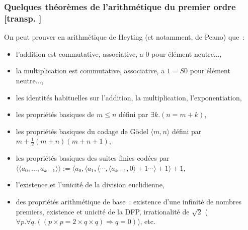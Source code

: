 \documentclass[mathserif,a4paper,aspectratio=169]{beamer}
\newcommand{\dbllangle}{\mathopen{\langle\!\langle}}
\newcommand{\dblrangle}{\mathclose{\rangle\!\rangle}}
\renewcommand{\frametitle}[1]{\subsubsection*{#1 {\footnotesize[transp. \insertframenumber]}}}
\begin{document}
\begin{frame}
\frametitle{Quelques théorèmes de l'arithmétique du premier ordre}

On peut prouver en arithmétique de Heyting (et notamment, de Peano)
que :
\begin{itemize}
\item l'addition est commutative, associative, a $0$ pour élément
  neutre...,
\item la multiplication est commutative, associative, a $1 = S0$ pour
  élément neutre...,
\item les identités habituelles sur l'addition, la multiplication,
  l'exponentiation,
\item les propriétés basiques de $m\leq n$ défini par $\exists
  k.(n=m+k)$,
\item les propriétés basiques du codage de Gödel $\langle m,n\rangle$
  défini par $m + \frac{1}{2}(m+n)(m+n+1)$,
\item les propriétés basiques des suites finies codées par $\dbllangle
  a_0,\ldots,a_{k-1}\dblrangle := \langle a_0, \langle a_1,
  \langle\cdots,\langle a_{k-1},0\rangle+1\cdots\rangle+1\rangle+1$,
\item l'existence et l'unicité de la division euclidienne,
\item des propriétés arithmétique de base : existence d'une infinité
  de nombres premiers, existence et unicité de la DFP, irrationalité
  de $\sqrt{2}$ ($\forall p. \forall q. ((p\times p = 2\times q \times
  q) \Rightarrow q = 0)$), etc.
\end{itemize}

\end{frame}
%
\end{document}
